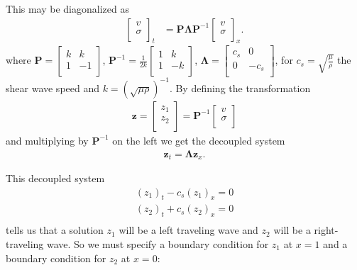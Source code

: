 \documentclass[12pt]{article}
\begin{document}
\begin{flushleft}
This may be diagonalized as 
\begin{align*}
\begin{bmatrix}
v \\
\sigma \\
\end{bmatrix}_t &= \mathbf{P} \boldsymbol{\Lambda} \mathbf{P}^{-1} \begin{bmatrix}
v \\
\sigma \\
\end{bmatrix}_x.
\end{align*}
where $\mathbf{P} = \begin{bmatrix}
k & k \\
1 & -1\\
\end{bmatrix}$, $\mathbf{P}^{-1} =\frac{1}{2k} \begin{bmatrix}
1 & k \\
1 & -k\\
\end{bmatrix}$, $\boldsymbol{\Lambda} = \begin{bmatrix}
c_s & 0 \\
0 & -c_s \\
\end{bmatrix}$, for $c_s = \sqrt{\frac{\mu}{\rho}}$ the shear wave speed and $k = (\sqrt{\mu \rho } )^{-1}$. By defining the transformation 
\begin{align*}
\mathbf{z} = \begin{bmatrix}
z_1 \\
z_2\\
\end{bmatrix} = \mathbf{P}^{-1} \begin{bmatrix}
v \\
\sigma \\
\end{bmatrix}
\end{align*}
and multiplying by $\mathbf{P}^{-1}$ on the left we get the decoupled system 
\begin{align*}
\mathbf{z}_t = \boldsymbol{\Lambda} \mathbf{z}_x.
\end{align*}

This decoupled system 
\begin{align*}
(z_1)_t - c_s (z_1)_x = 0 \\
(z_2)_t + c_s (z_2)_x = 0\\
\end{align*}
tells us that a solution $z_1$ will be a left traveling wave and $z_2$ will be a right-traveling wave. So we must specify a boundary condition for $z_1$ at $x=1$ and a boundary condition for $z_2$ at $x=0$:


\end{flushleft}
\end{document}
